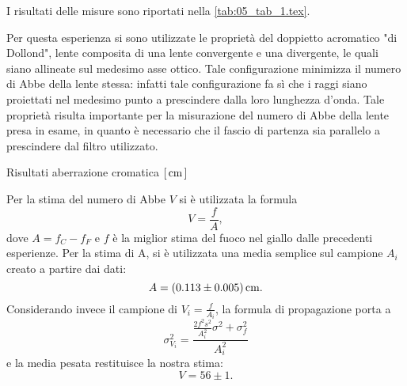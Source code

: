 I risultati delle misure sono riportati nella \autoref{tab:05_tab_1.tex}.

Per questa esperienza si sono utilizzate le propriet\`a del doppietto 
acromatico "di Dollond", lente composita di una lente convergente e una 
divergente, le quali siano allineate sul medesimo asse ottico. Tale 
configurazione minimizza il numero di Abbe della lente stessa: infatti 
tale configurazione fa s\`i che i raggi siano proiettati nel medesimo 
punto a prescindere dalla loro lunghezza d'onda. Tale propriet\`a risulta 
importante per la misurazione del numero di Abbe della lente presa in esame, 
in quanto \`e necessario che il fascio di partenza sia parallelo a 
prescindere dal filtro utilizzato.
\begin{tabella}
	\centering
	
	\caption{Risultati aberrazione cromatica $[\,\mathrm{cm}\,]$}
	\label{tab:05_tab_1.tex}
\end{tabella}

Per la stima del numero di Abbe $V$ si \`e utilizzata la formula
\[ V=\frac{f}{A} ,\]
dove \(A= f_C - f_F\) e $f$ \`e la miglior stima del fuoco nel giallo dalle precedenti esperienze. %
Per la stima di A, si \`e utilizzata una media semplice sul campione ${A_i}$ creato a partire dai dati:
\[ A = (0.113 \pm 0.005) \,\mathrm{cm} .\]
Considerando invece il campione di \( V_i=\frac{f}{A_i} \), la formula di propagazione porta a 
\[  \sigma^2_{V_i} = \frac{
\frac{2f^2   s^2}{A_i^2}   \sigma^2 +  \sigma^2_{f}
}{A_i^2} \]
e la media pesata restituisce la nostra stima:
\[V= 56 \pm 1 .\]

